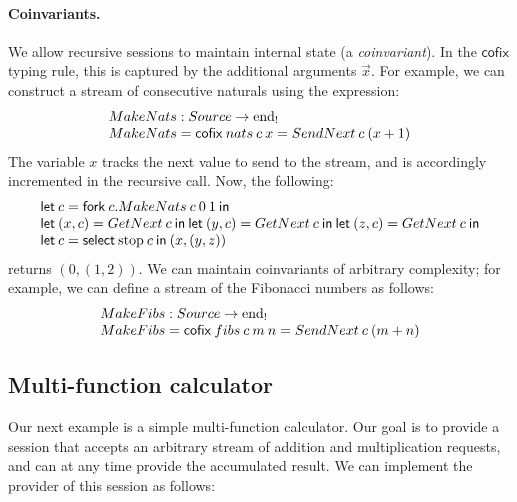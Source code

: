\documentclass[orivec,envcountsame]{llncs}
\makeatletter
\newcommand{\uto}{\ensuremath{\rightarrow}}
\newcommand{\outterm}{\mathrm{end}_!}
\newcommand{\mkwd}[1]{\mathsf{#1}}
\newcommand{\clabel}[1]{\mathrm{#1}}
\newcommand{\gvselect}[2]{\mkwd{select}\:#1\:#2}
\newcommand{\gvfork}[2]{\mkwd{fork}\:#1.#2}
\newcommand{\lrkwd}{\mkwd{cofix}}
\newcommand{\gvfix}[3]{\lrkwd\:#1\:#2 = #3}
\newcommand{\key}{\mkwd}
\newcommand{\cofix}{\lrkwd}
\newcommand{\ba}{\begin{array}}
\newcommand{\ea}{\end{array}}
\newcommand{\bl}{\ba[t]{@{}l@{}}}
\newcommand{\el}{\ea}
\makeatother
\begin{document}
\paragraph{Coinvariants.}

We allow recursive sessions to maintain internal state (a \emph{coinvariant}). In the $\cofix$
typing rule, this is captured by the additional arguments $\vec{x}$. For example, we can construct a
stream of consecutive naturals using the expression:
\[
\bl
  MakeNats : Source \uto \outterm \\
  MakeNats = \gvfix{nats}{c\:x}{SendNext\:c\:(x + 1)} \\
\el
\]
The variable $x$ tracks the next value to send to the stream, and is accordingly incremented in the
recursive call. Now, the following:
\[
\bl
\key{let}\:c = \gvfork{c}{MakeNats\:c\:0\:1}\:\key{in} \\
\key{let}\:(x, c) = GetNext\:c\:\key{in}\:
\key{let}\:(y, c) = GetNext\:c\:\key{in}\:
\key{let}\:(z, c) = GetNext\:c\:\key{in} \\
\key{let}\:c = \gvselect{\clabel{stop}}{c}\:\key{in}\:(x,(y,z)) \\
\el
\]
returns $(0, (1, 2))$.
%
We can maintain coinvariants of arbitrary complexity; for example, we can define a
stream of the Fibonacci numbers as follows:
\[
\bl
  MakeFibs : Source \uto \outterm \\
  MakeFibs = \gvfix{fibs}{c\:m\:n}{SendNext\:c\:(m + n)} \\
\el
\]

\subsection{Multi-function calculator}

Our next example is a simple multi-function calculator. Our goal is to provide a session that
accepts an arbitrary stream of addition and multiplication requests, and can at any time provide the
accumulated result.  We can implement the provider of this session as follows:
\end{document}
